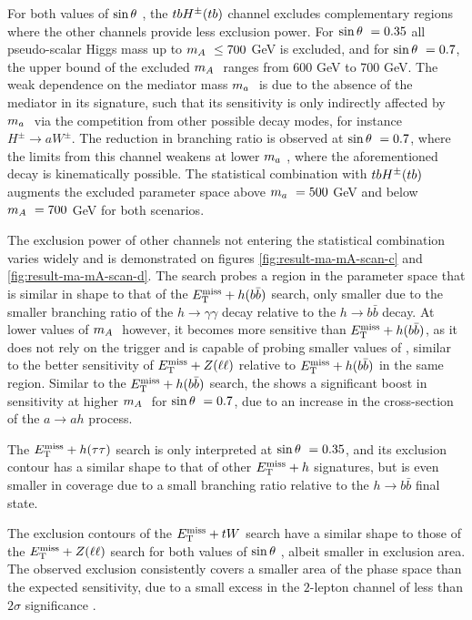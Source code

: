 For both values of $\sin\theta~$, the $tbH^{\pm}(tb)$ channel excludes complementary regions where the other channels provide less exclusion power. For $\sin\theta~=0.35$ all pseudo-scalar Higgs mass up to $m_A~\le 700$ GeV is excluded, and for $\sin\theta~=0.7$, the upper bound of the excluded $m_A~$ ranges from 600 GeV to 700 GeV. The weak dependence on the mediator mass $m_a~$ is due to the absence of the mediator in its signature, such that its sensitivity is only indirectly affected by $m_a~$ via the competition from other possible decay modes, for instance $H^{\pm}\rightarrow aW^{\pm}$. The reduction in branching ratio is observed at $\sin\theta~=0.7$, where the limits from this channel weakens at lower $m_a~$, where the aforementioned decay is kinematically possible. The statistical combination with $tbH^{\pm}(tb)$ augments the excluded parameter space above $m_a~=500$ GeV and below $m_A~=700$ GeV for both scenarios. 

The exclusion power of other channels not entering the statistical combination varies widely and is demonstrated on figures \ref{fig:result-ma-mA-scan-c} and \ref{fig:result-ma-mA-scan-d}. The \monohgamgam search probes a region in the parameter space that is similar in shape to that of the $E_{\mathrm{T}}^{\mathrm{miss}}+h(b\bar{b})$ search, only smaller due to the smaller branching ratio of the $h\rightarrow \gamma\gamma$ decay relative to the $h\rightarrow b\bar{b}$ decay. At lower values of $m_A~$ however, it becomes more sensitive than $E_{\mathrm{T}}^{\mathrm{miss}}+h(b\bar{b})$, as it does not rely on the \met trigger and is capable of probing smaller values of \met, similar to the better sensitivity of $E_{\mathrm{T}}^{\mathrm{miss}}+Z(\ell\ell)$ relative to $E_{\mathrm{T}}^{\mathrm{miss}}+h(b\bar{b})$ in the same region. Similar to the $E_{\mathrm{T}}^{\mathrm{miss}}+h(b\bar{b})$ search, the \monohgamgam shows a significant boost in sensitivity at higher $m_A~$ for $\sin\theta~=0.7$, due to an increase in the cross-section of the $a\rightarrow ah$ process. 

The $E_{\mathrm{T}}^{\mathrm{miss}}+h(\tau\tau)$ search is only interpreted at $\sin\theta~ = 0.35$, and its exclusion contour has a similar shape to that of other $E_{\mathrm{T}}^{\mathrm{miss}}+h$ signatures, but is even smaller in coverage due to a small branching ratio relative to the $h\rightarrow b\bar{b}$ final state. 

The exclusion contours of the $E_{\mathrm{T}}^{\mathrm{miss}}+tW$ search have a similar shape to those of the $E_{\mathrm{T}}^{\mathrm{miss}}+Z(\ell\ell)$ search for both values of $\sin\theta~$, albeit smaller in exclusion area. The observed exclusion consistently covers a smaller area of the phase space than the expected sensitivity, due to a small excess in the $2$-lepton channel of less than $2\sigma$ significance \cite{EXOT-2018-43}. 

